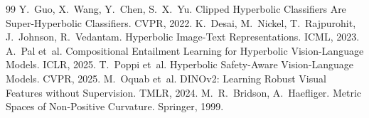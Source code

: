 \documentclass[10pt]{article}
\begin{document}
\begin{thebibliography}{99}
 Y.~Guo, X.~Wang, Y.~Chen, S.~X.~Yu. Clipped Hyperbolic Classifiers Are Super-Hyperbolic Classifiers. CVPR, 2022.
 K.~Desai, M.~Nickel, T.~Rajpurohit, J.~Johnson, R.~Vedantam. Hyperbolic Image-Text Representations. ICML, 2023.
 A.~Pal et~al. Compositional Entailment Learning for Hyperbolic Vision-Language Models. ICLR, 2025.
 T.~Poppi et~al. Hyperbolic Safety-Aware Vision-Language Models. CVPR, 2025.
 M.~Oquab et~al. DINOv2: Learning Robust Visual Features without Supervision. TMLR, 2024.
 M.~R.~Bridson, A.~Haefliger. Metric Spaces of Non-Positive Curvature. Springer, 1999.
\end{thebibliography}
\end{document}
